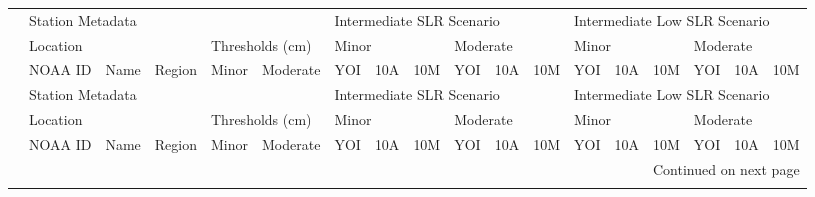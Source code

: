 \begin{longtable}{llllllllllllllllll}
\toprule
{} & \multicolumn{5}{l}{Station Metadata} & \multicolumn{6}{l}{Intermediate SLR Scenario} & \multicolumn{6}{l}{Intermediate Low SLR Scenario} \\
{} & \multicolumn{3}{l}{Location} & \multicolumn{2}{l}{Thresholds (cm)} & \multicolumn{3}{l}{Minor} & \multicolumn{3}{l}{Moderate} & \multicolumn{3}{l}{Minor} & \multicolumn{3}{l}{Moderate} \\
{} &          NOAA ID &                        Name &                   Region &           Minor & Moderate &                       YOI &  10A &    10M &      YOI &  10A &    10M &                           YOI & 10A &   10M &      YOI &  10A &   10M \\
\midrule
\endfirsthead

\toprule
{} & \multicolumn{5}{l}{Station Metadata} & \multicolumn{6}{l}{Intermediate SLR Scenario} & \multicolumn{6}{l}{Intermediate Low SLR Scenario} \\
{} & \multicolumn{3}{l}{Location} & \multicolumn{2}{l}{Thresholds (cm)} & \multicolumn{3}{l}{Minor} & \multicolumn{3}{l}{Moderate} & \multicolumn{3}{l}{Minor} & \multicolumn{3}{l}{Moderate} \\
{} &          NOAA ID &                        Name &                   Region &           Minor & Moderate &                       YOI &  10A &    10M &      YOI &  10A &    10M &                           YOI & 10A &   10M &      YOI &  10A &   10M \\
\midrule
\endhead
\midrule
\multicolumn{18}{r}{{Continued on next page}} \\
\midrule
\endfoot


\end{longtable}
